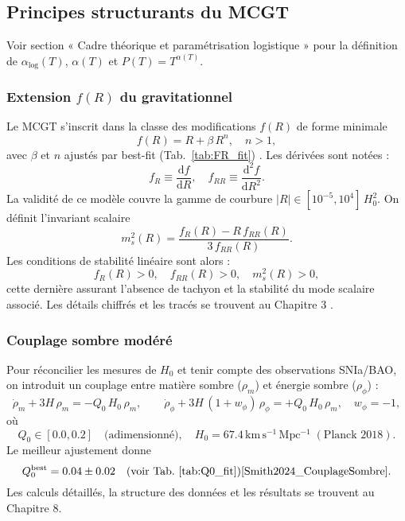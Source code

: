 \subsection{Principes structurants du MCGT}

\noindent Voir section « Cadre théorique et paramétrisation logistique » pour la définition de \(\alpha_{\mathrm{log}}(T)\), \(\alpha(T)\) et \(P(T)=T^{\alpha(T)}\).

\subsubsection{Extension \(f(R)\) du gravitationnel}

Le MCGT s’inscrit dans la classe des modifications \(f(R)\) de forme minimale
\[
  f(R) = R + \beta\,R^{n}, 
  \quad n>1,
\]
avec \(\beta\) et \(n\) ajustés par best-fit (Tab.~\ref{tab:FR_fit}) \cite{MCGT_FR_analysis}.  
Les dérivées sont notées :
\[
  f_{R}\equiv\frac{\mathrm d f}{\mathrm d R},
  \quad
  f_{RR}\equiv\frac{\mathrm d^{2} f}{\mathrm d R^{2}}.
\]
La validité de ce modèle couvre la gamme de courbure  
\(\lvert R\rvert\in[10^{-5},10^{4}]\,H_{0}^{2}\).  
On définit l’invariant scalaire
\[
  m_{s}^{2}(R)
  = \frac{f_{R}(R) - R\,f_{RR}(R)}{3\,f_{RR}(R)}.
\]
Les conditions de stabilité linéaire sont alors :
\[
  f_{R}(R) > 0,\quad f_{RR}(R) > 0,\quad m_{s}^{2}(R) > 0,
\]
cette dernière assurant l’absence de tachyon et la stabilité du mode scalaire associé.  
Les détails chiffrés et les tracés se trouvent au Chapitre 3 \cite{MCGT_FR_analysis}.  

\subsubsection{Couplage sombre modéré}

Pour réconcilier les mesures de \(H_{0}\) et tenir compte des observations SNIa/BAO, on introduit un couplage entre matière sombre (\(\rho_{m}\)) et énergie sombre (\(\rho_{\phi}\)) :
\[
  \dot{\rho}_{m} + 3H\,\rho_{m} = -Q_{0}\,H_{0}\,\rho_{m},
\qquad
  \dot{\rho}_{\phi} + 3H\,(1+w_{\phi})\,\rho_{\phi} = +Q_{0}\,H_{0}\,\rho_{m},
\quad w_{\phi}=-1,
\]
où  
\[
  Q_{0}\in[0.0,0.2]\quad\text{(adimensionné)}, 
  \quad 
  H_{0}=67.4\,\mathrm{km\,s^{-1}\,Mpc^{-1}}\;(\text{Planck 2018}).
\]
Le meilleur ajustement donne  
\[
  Q_{0}^{\mathrm{best}} = 0.04 \pm 0.02
  \quad(\text{voir Tab.~\ref{tab:Q0_fit}})\cite{Smith2024_CouplageSombre}.
\]
Les calculs détaillés, la structure des données et les résultats se trouvent au Chapitre 8.  

